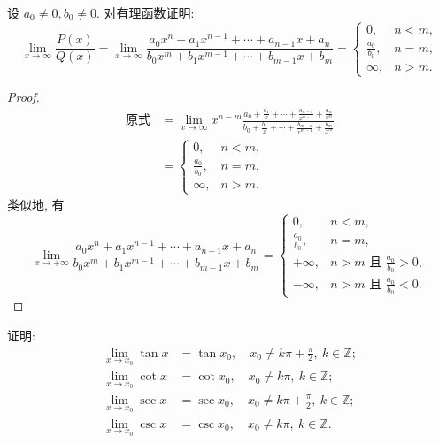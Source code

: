 \begin{example}\label{ex:2.2.5}
设 $a_{0} \neq 0, b_{0} \neq 0$. 对有理函数证明:
\[
\lim_{x\to\infty}\frac{P(x)}{Q(x)} = \lim_{x\to\infty}\frac{a_0x^n+a_1x^{n-1}+\cdots+a_{n-1}x+a_n}{b_0x^m+b_1x^{m-1}+\cdots+b_{m-1}x+b_m} = \begin{cases}
0, & n<m, \\
\frac{a_0}{b_0}, & n=m, \\
\infty, & n>m.
\end{cases}
\]
\end{example}

\begin{proof}
\begin{align*}
\text{原式} &= \lim_{x\to\infty}x^{n-m}\frac{a_{0}+\frac{a_{1}}{x}+\cdots+\frac{a_{n-1}}{x^{n-1}}+\frac{a_{n}}{x^{n}}}{b_{0}+\frac{b_{1}}{x}+\cdots+\frac{b_{m-1}}{x^{m-1}}+\frac{b_{m}}{x^{m}}} \\
&= \begin{cases}
0, & n<m, \\
\frac{a_{0}}{b_{0}}, & n=m, \\
\infty, & n>m.
\end{cases}
\end{align*}
类似地, 有
\[
\lim_{x\to+\infty}\frac{a_{0}x^{n}+a_{1}x^{n-1}+\cdots+a_{n-1}x+a_{n}}{b_{0}x^{m}+b_{1}x^{m-1}+\cdots+b_{m-1}x+b_{m}} = \begin{cases}
0, & n<m, \\
\frac{a_0}{b_0}, & n=m, \\
+\infty, & n>m \text{ 且 } \frac{a_0}{b_0}>0, \\
-\infty, & n>m \text{ 且 } \frac{a_0}{b_0}<0.
\end{cases}
\]
\end{proof}

\begin{example}\label{ex:2.2.6}
证明:
\begin{align*}
\lim_{x\to x_0} \tan x &= \tan x_0, \quad x_0 \neq k\pi + \frac{\pi}{2},\ k \in \mathbb{Z}; \\
\lim_{x\to x_0} \cot x &= \cot x_0, \quad x_0 \neq k\pi,\ k \in \mathbb{Z}; \\
\lim_{x\to x_0} \sec x &= \sec x_0, \quad x_0 \neq k\pi + \frac{\pi}{2},\ k \in \mathbb{Z}; \\
\lim_{x\to x_0} \csc x &= \csc x_0, \quad x_0 \neq k\pi,\ k \in \mathbb{Z}.
\end{align*}
\end{example}

